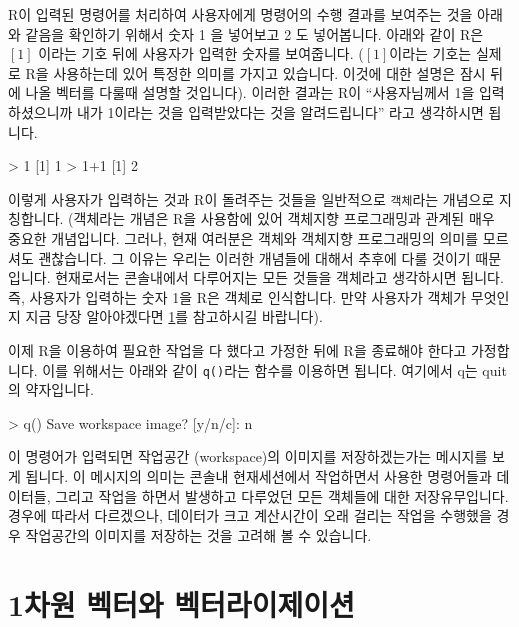 \documentclass[tutorial.tex]{subfiles}
\begin{document}
R이 입력된 명령어를 처리하여 사용자에게 명령어의 수행 결과를 보여주는 것을 아래와 같음을 확인하기 위해서 숫자 1 을 넣어보고 2 도 넣어봅니다. 
아래와 같이 R은 $[1]$ 이라는 기호 뒤에 사용자가 입력한 숫자를 보여줍니다.
($[1]$이라는 기호는 실제로 R을 사용하는데 있어 특정한 의미를 가지고 있습니다. 이것에 대한 설명은 잠시 뒤에 나올 벡터를 다룰때 설명할 것입니다).
이러한 결과는 R이 ``사용자님께서 1을 입력하셨으니까 내가 1이라는 것을 입력받았다는 것을 알려드립니다'' 라고 생각하시면 됩니다. 

\begin{Schunk}
\begin{Soutput}
> 1
[1] 1
> 1+1
[1] 2
\end{Soutput}
\end{Schunk}

이렇게 사용자가 입력하는 것과 R이 돌려주는 것들을 일반적으로 \texttt{객체}라는 개념으로 지칭합니다. 
(객체라는 개념은 R을 사용함에 있어 객체지향 프로그래밍과 관계된 매우 중요한 개념입니다. 그러나, 현재 여러분은 객체와 객체지향 프로그래밍의 의미를 모르셔도 괜찮습니다.  그 이유는 우리는 이러한 개념들에 대해서 추후에 다룰 것이기 때문입니다.  현재로서는 콘솔내에서 다루어지는 모든 것들을 객체라고 생각하시면 됩니다.  즉, 사용자가 입력하는 숫자 1을 R은 객체로 인식합니다.  만약 사용자가 객체가 무엇인지 지금 당장 알아야겠다면 \ref{}를 참고하시길 바랍니다).

이제 R을 이용하여 필요한 작업을 다 했다고 가정한 뒤에 R을 종료해야 한다고 가정합니다. 
이를 위해서는 아래와 같이 \texttt{q()}라는 함수를 이용하면 됩니다.
여기에서 q는 quit의 약자입니다. 

\begin{Schunk}
\begin{Soutput}
> q()
Save workspace image? [y/n/c]: n
\end{Soutput}
\end{Schunk}

이 명령어가 입력되면 작업공간 (workspace)의 이미지를 저장하겠는가는 메시지를 보게 됩니다.
이 메시지의 의미는 콘솔내 현재세션에서 작업하면서 사용한 명령어들과 데이터들, 그리고 작업을 하면서 발생하고 다루었던 모든 객체들에 대한 저장유무입니다.  
경우에 따라서 다르겠으나, 데이터가 크고 계산시간이 오래 걸리는 작업을 수행했을 경우 작업공간의 이미지를 저장하는 것을 고려해 볼 수 있습니다. 


\section{1차원 벡터와 벡터라이제이션}
\end{document}
